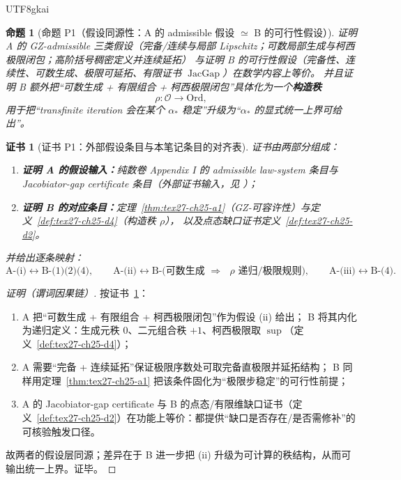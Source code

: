 \documentclass[12pt]{article}
\newtheorem{proposition}{命题}[section]
\newtheorem{Certificate}{证书}[section]
\newcommand{\JacGap}{\operatorname{JacGap}}
\begin{document}
\begin{CJK*}{UTF8}{gkai}
\begin{proposition}[命题 P1（假设同源性：A 的 admissible 假设 $\simeq$ B 的可行性假设）]
\label{prop:tex27-ch26-p1}
证明 A 的 GZ-admissible 三类假设（完备/连续与局部 Lipschitz；可数局部生成与柯西极限闭包；高阶括号稠密定义并连续延拓）
与证明 B 的可行性假设（完备性、连续性、可数生成、极限可延拓、有限证书 $\JacGap$）在数学内容上等价。
并且证明 B 额外把“可数生成 + 有限组合 + 柯西极限闭包”具体化为一个\textbf{构造秩}
\[
  \rho:\mathcal{O}\to\mathrm{Ord},
\]
用于把“transfinite iteration 会在某个 $\alpha_\ast$ 稳定”升级为“$\alpha_\ast$ 的显式统一上界可给出”。
\end{proposition}

\begin{Certificate}[证书 P1：外部假设条目与本笔记条目的对齐表]
\label{cert:tex27-ch26-p1}
证书由两部分组成：
\begin{enumerate}
  \item \textbf{证明 A 的假设输入：}纯数卷 Appendix I 的 admissible law-system 条目与 Jacobiator-gap certificate 条目（外部证书输入，见
    \cite{GaoZheng2025GFramework}）；
  \item \textbf{证明 B 的对应条目：}定理~\ref{thm:tex27-ch25-a1}（GZ-可容许性）与定义~\ref{def:tex27-ch25-d4}（构造秩 $\rho$），
    以及点态缺口证书定义~\ref{def:tex27-ch25-d2}。
\end{enumerate}
并给出逐条映射：
\[
  \text{A-(i)}\leftrightarrow\text{B-(1)(2)(4)},\qquad
  \text{A-(ii)}\leftrightarrow\text{B-(可数生成 $\Rightarrow$ $\rho$ 递归/极限规则)},\qquad
  \text{A-(iii)}\leftrightarrow\text{B-(4)}.
\]
\end{Certificate}

\begin{proof}[证明（谓词因果链）]
按证书~\ref{cert:tex27-ch26-p1}：
\begin{enumerate}
  \item A 把“可数生成 + 有限组合 + 柯西极限闭包”作为假设 (ii) 给出；
  B 将其内化为递归定义：生成元秩 $0$、二元组合秩 $+1$、柯西极限取 $\sup$（定义~\ref{def:tex27-ch25-d4}）；
  \item A 需要“完备 + 连续延拓”保证极限序数处可取完备直极限并延拓结构；
  B 同样用定理~\ref{thm:tex27-ch25-a1} 把该条件固化为“极限步稳定”的可行性前提；
  \item A 的 Jacobiator-gap certificate 与 B 的点态/有限维缺口证书（定义~\ref{def:tex27-ch25-d2}）在功能上等价：都提供“缺口是否存在/是否需修补”的可核验触发口径。
\end{enumerate}
故两者的假设层同源；差异在于 B 进一步把 (ii) 升级为可计算的秩结构，从而可输出统一上界。证毕。
\end{proof}


\end{CJK*}
\end{document}
